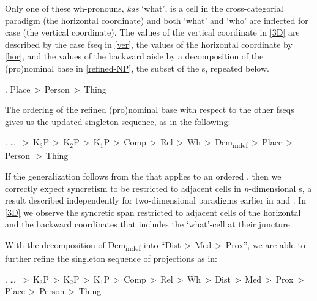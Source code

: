 \begin{center}
\end{center}

\noindent Only one of these wh-pronouns, \textit{kas} `what', is a cell in the cross-categorial paradigm (the horizontal coordinate) and both `what' and `who' are inflected for case (the vertical coordinate). The values of the vertical coordinate in \ref{3D} are described by the case fseq in \ref{ver}, the values of the horizontal coordinate by \ref{hor}, and the values of the backward aisle by a decomposition of the (pro)nominal base in \ref{refined-NP}, the subset of the s, repeated below.

\ex. Place\,$>$\,Person\,$>$\,Thing

The ordering of the refined (pro)nominal base with respect to the other fseqs gives us the updated singleton sequence, as in the following:

\ex. \ldots \ $>$\,K$_{3}$P\,$>$\,K$_{2}$P\,$>$\,K$_{1}$P\,$>$\,Comp\,$>$\,Rel\,$>$\,Wh\,$>$\,Dem\textsubscript{indef}\,$>$\,Place\,$>$\\
Person $>$\,Thing

\noindent
If the  generalization follows from the  that applies to an ordered , then we correctly expect syncretism to be restricted to adjacent cells in \textit{n}-dimensional s, a result described independently for two-dimensional paradigms earlier in \cite{CahaPantcheva2012} and \cite{GVW2018}. In \ref{3D} we observe the syncretic span restricted to adjacent cells of the horizontal and the backward coordinates that includes the `what'-cell at their juncture.
\par With the decomposition of Dem\textsubscript{indef} into ``Dist\,$>$\,Med\,$>$\,Prox'', we are able to further refine the singleton sequence of projections as in:

\ex. \ldots \ $>$\,K$_{3}$P\,$>$\,K$_{2}$P\,$>$\,K$_{1}$P\,$>$\,Comp\,$>$\,Rel\,$>$\,Wh\,$>$\,Dist\,$>$\,Med\,$>$\,Prox\,$>$\\ 
Place\,$>$\,Person\,$>$\,Thing

